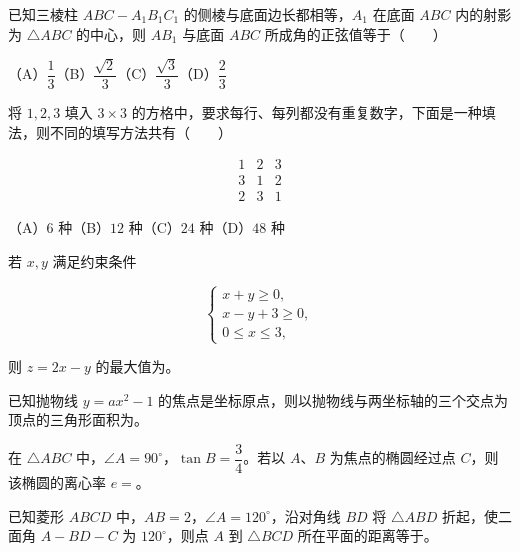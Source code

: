 \begin{question}
已知三棱柱 $ABC-A_1B_1C_1$ 的侧棱与底面边长都相等，$A_1$ 在底面 $ABC$ 内的射影为 $\triangle ABC$ 的中心，则 $AB_1$ 与底面 $ABC$ 所成角的正弦值等于\mbox{（　　）}

（A）$\dfrac13$\quad（B）$\dfrac{\sqrt2}{3}$\quad（C）$\dfrac{\sqrt3}{3}$\quad（D）$\dfrac23$

\end{question}
\begin{question}
将 $1,2,3$ 填入 $3\times3$ 的方格中，要求每行、每列都没有重复数字，下面是一种填法，则不同的填写方法共有\mbox{（　　）}

\nopagebreak[4]
\[
\begin{matrix}1&2&3\\3&1&2\\2&3&1\end{matrix}
\]

（A）$6$ 种\quad（B）$12$ 种\quad（C）$24$ 种\quad（D）$48$ 种

\end{question}

\begin{question}
若 $x,y$ 满足约束条件

\nopagebreak[4]
\[
\begin{cases}
x+y\geqslant0,\\
x-y+3\geqslant0,\\
0\leqslant x\leqslant3,
\end{cases}
\]

则 $z=2x-y$ 的最大值为\gkblank{}。

\end{question}
\begin{question}
已知抛物线 $y=ax^2-1$ 的焦点是坐标原点，则以抛物线与两坐标轴的三个交点为顶点的三角形面积为\gkblank{}。

\end{question}
\begin{question}
在 $\triangle ABC$ 中，$\angle A=90^\circ$，$\tan B=\dfrac34$。若以 $A\text{、}B$ 为焦点的椭圆经过点 $C$，则该椭圆的离心率 $e=$\gkblank{}。

\end{question}
\begin{question}
已知菱形 $ABCD$ 中，$AB=2$，$\angle A=120^\circ$，沿对角线 $BD$ 将 $\triangle ABD$ 折起，使二面角 $A-BD-C$ 为 $120^\circ$，则点 $A$ 到 $\triangle BCD$ 所在平面的距离等于\gkblank{}。

\end{question}

